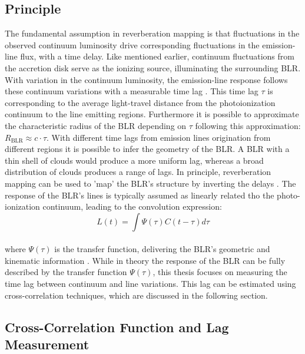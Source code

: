 \subsection{Principle}
\label{subsec:rm_principle}

The fundamental assumption in reverberation mapping is that fluctuations in the observed continuum luminosity drive corresponding fluctuations in the emission-line flux, with a time delay. Like mentioned earlier, continuum fluctuations from the accretion disk serve as the ionizing source, illuminating the surrounding BLR. With variation in the continuum luminosity, the emission-line response follows these continuum variations with a measurable time lag \parencite{Cackett2021}.
This time lag $\tau$ is corresponding to the average light-travel distance from the photoionization continuum to the line emitting regions. Furthermore it is possible to approximate the characteristic radius of the BLR depending on $\tau$ following this approximation: $R_{\mathrm{BLR}} \approx c \cdot \tau$. With different time lags from emission lines origination from different regions it is possible to infer the geometry of the BLR. A BLR with a thin shell of clouds would produce a more uniform lag, whereas a broad distribution of clouds produces a range of lags. In principle, reverberation mapping can be used to 'map' the BLR’s structure by inverting the delays \parencite{peterson1997introduction}.
The response of the BLR's lines is typically assumed as linearly related tho the photo-ionization continuum, leading to the convolution expression:
\\
\begin{equation}
	L\left(t\right) = \int \Psi\left(\tau\right)C\left(t-\tau\right) d\tau
\end{equation}
\\
where $\Psi\left(\tau\right)$ is the transfer function, delivering the BLR's geometric and kinematic information \parencite{horne2004observational}.
While in theory the response of the BLR can be fully described by the transfer function $\Psi\left(\tau\right)$, this thesis focuses on measuring the time lag between continuum and line variations. This lag can be estimated using cross-correlation techniques, which are discussed in the following section.


\subsection{Cross-Correlation Function and Lag Measurement}
\label{subsec:rm_ccf}

